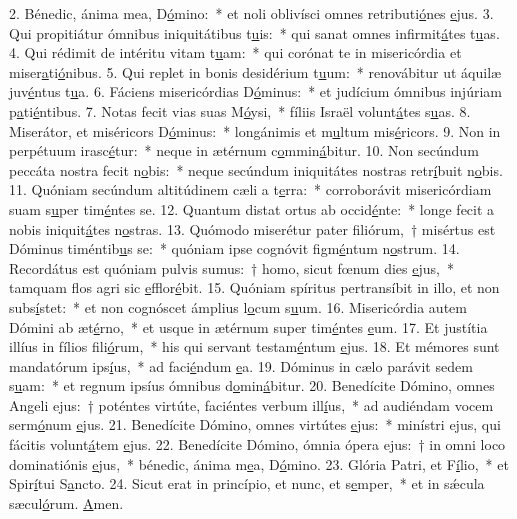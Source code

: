 2. Bénedic, ánima mea, D\uline{ó}mino:~* et noli oblivísci omnes retributi\uline{ó}nes \uline{e}jus.
3. Qui propitiátur ómnibus iniquitátibus t\uline{u}is:~* qui sanat omnes infirmit\uline{á}tes t\uline{u}as.
4. Qui rédimit de intéritu vitam t\uline{u}am:~* qui corónat te in misericórdia et miser\uline{a}ti\uline{ó}nibus.
5. Qui replet in bonis desidérium t\uline{u}um:~* renovábitur ut áquilæ juv\uline{é}ntus t\uline{u}a.
6. Fáciens misericórdias D\uline{ó}minus:~* et judícium ómnibus injúriam p\uline{a}ti\uline{é}ntibus.
7. Notas fecit vias suas M\uline{ó}ysi,~* fíliis Israël volunt\uline{á}tes s\uline{u}as.
8. Miserátor, et miséricors D\uline{ó}minus:~* longánimis et m\uline{u}ltum mis\uline{é}ricors.
9. Non in perpétuum irasc\uline{é}tur:~* neque in ætérnum c\uline{o}mmin\uline{á}bitur.
10. Non secúndum peccáta nostra fecit n\uline{o}bis:~* neque secúndum iniquitátes nostras retr\uline{í}buit n\uline{o}bis.
11. Quóniam secúndum altitúdinem cæli a t\uline{e}rra:~* corroborávit misericórdiam suam s\uline{u}per tim\uline{é}ntes se.
12. Quantum distat ortus ab occid\uline{é}nte:~* longe fecit a nobis iniquit\uline{á}tes n\uline{o}stras.
13. Quómodo miserétur pater filiórum,~† misértus est Dóminus timéntib\uline{u}s se:~* quóniam ipse cognóvit figm\uline{é}ntum n\uline{o}strum.
14. Recordátus est quóniam pulvis sumus:~† homo, sicut fœnum dies \uline{e}jus,~* tamquam flos agri sic \uline{e}fflor\uline{é}bit.
15. Quóniam spíritus pertransíbit in illo, et non subs\uline{í}stet:~* et non cognóscet ámplius l\uline{o}cum s\uline{u}um.
16. Misericórdia autem Dómini ab æt\uline{é}rno,~* et usque in ætérnum super tim\uline{é}ntes \uline{e}um.
17. Et justítia illíus in fílios fili\uline{ó}rum,~* his qui servant testam\uline{é}ntum \uline{e}jus.
18. Et mémores sunt mandatórum ips\uline{í}us,~* ad faci\uline{é}ndum \uline{e}a.
19. Dóminus in cælo parávit sedem s\uline{u}am:~* et regnum ipsíus ómnibus d\uline{o}min\uline{á}bitur.
20. Benedícite Dómino, omnes Angeli ejus:~† poténtes virtúte, faciéntes verbum ill\uline{í}us,~* ad audiéndam vocem serm\uline{ó}num \uline{e}jus.
21. Benedícite Dómino, omnes virtútes \uline{e}jus:~* minístri ejus, qui fácitis volunt\uline{á}tem \uline{e}jus.
22. Benedícite Dómino, ómnia ópera ejus:~† in omni loco dominatiónis \uline{e}jus,~* bénedic, ánima m\uline{e}a, D\uline{ó}mino.
23. Glória Patri, et F\uline{í}lio,~* et Spir\uline{í}tui S\uline{a}ncto.
24. Sicut erat in princípio, et nunc, et s\uline{e}mper,~* et in sǽcula sæcul\uline{ó}rum. \uline{A}men.
